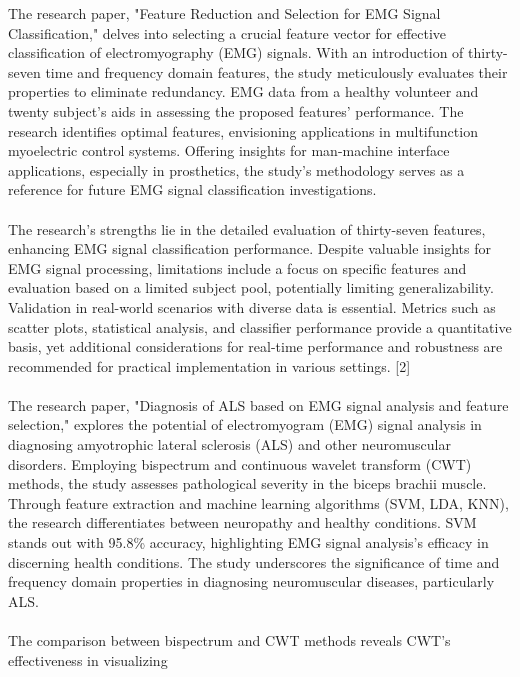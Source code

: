 \documentclass[ 12pt,a4paper,twocolumn,fleqn]{report}
\begin{document}
\newpage
  \pagestyle{fancy}
\thisfancypage{%
  \setlength{\fboxsep}{20pt}\doublebox}{}
\normalsize
The research paper, "Feature Reduction and Selection for EMG Signal Classification," delves into
selecting a crucial feature vector for effective classification of electromyography (EMG) signals. With
an introduction of thirty-seven time and frequency domain features, the study meticulously evaluates
their properties to eliminate redundancy. EMG data from a healthy volunteer and twenty subject’s aids
in assessing the proposed features' performance. The research identifies optimal features, envisioning
applications in multifunction myoelectric control systems. Offering insights for man-machine interface
applications, especially in prosthetics, the study's methodology serves as a reference for future EMG
signal classification investigations.
\\
\hfill
\\
The research's strengths lie in the detailed evaluation of thirty-seven features, enhancing EMG signal
classification performance. Despite valuable insights for EMG signal processing, limitations include a
focus on specific features and evaluation based on a limited subject pool, potentially limiting
generalizability. Validation in real-world scenarios with diverse data is essential. Metrics such as scatter
plots, statistical analysis, and classifier performance provide a quantitative basis, yet additional
considerations for real-time performance and robustness are recommended for practical implementation
in various settings. [2]
\\
\hfill
\\
The research paper, "Diagnosis of ALS based on EMG signal analysis and feature selection," explores
the potential of electromyogram (EMG) signal analysis in diagnosing amyotrophic lateral sclerosis
(ALS) and other neuromuscular disorders. Employing bispectrum and continuous wavelet transform
(CWT) methods, the study assesses pathological severity in the biceps brachii muscle. Through feature
extraction and machine learning algorithms (SVM, LDA, KNN), the research differentiates between
neuropathy and healthy conditions. SVM stands out with 95.8\% accuracy, highlighting EMG signal
analysis's efficacy in discerning health conditions. The study underscores the significance of time and
frequency domain properties in diagnosing neuromuscular diseases, particularly ALS.
\\
\hfill
\\
The comparison between bispectrum and CWT methods reveals CWT's effectiveness in visualizing
\end{document}
